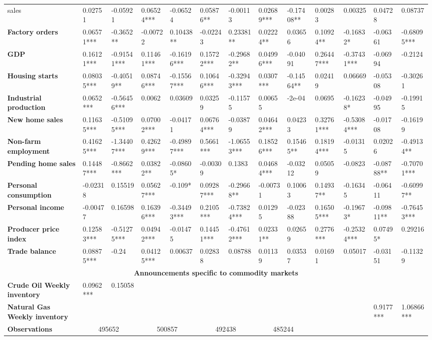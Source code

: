 \begin{sidewaystable}
{\begin{tabular}{@{}lllllllllllll@{}}
sales}& 0.02751 & -0.05921 & 0.06524*** & -0.06524 & 0.05876** & -0.00113 & 0.02689*** & -0.17408** & 0.00283 & 0.00325 & 0.04728 & 0.08737 \\ \textbf{Factory orders}& 0.06571*** & -0.3652** & -0.00722 & 0.10438** & -0.02243 & 0.23381** & 0.02224** & 0.03656 & 0.10924** & -0.16832* & -0.06361 & -0.68095*** \\ \textbf{GDP}& 0.16121*** & -0.91541*** & 0.11461*** & -0.16196*** & 0.15722*** & -0.29682** & 0.04996*** & -0.04091 & 0.26447*** & -0.37431*** & -0.06994 & -0.2124 \\ \textbf{Housing starts}& 0.08035*** & -0.40519** & 0.08746*** & -0.15567*** & 0.10646*** & -0.32943*** & 0.0307*** & -0.14564** & 0.02419 & 0.06669 & -0.05308 & -0.30261 \\ \textbf{Industrial production}& 0.0652*** & -0.56456*** & 0.0062 & 0.03609 & 0.03259 & -0.11575 & 0.00655 & -2e-04 & 0.0695 & -0.16238* & -0.04995 & -0.19915 \\ \textbf{New home sales}& 0.11635*** & -0.51095*** & 0.07002*** & -0.04171 & 0.06764*** & -0.03879 & 0.04642*** & 0.04233 & 0.32761*** & -0.53084*** & -0.01708 & -0.16199 \\ \textbf{Non-farm employment}& 0.41625*** & -1.34407*** & 0.42629*** & -0.49897*** & 0.5661*** & -1.06553*** & 0.18526*** & 0.15465** & 0.18194*** & -0.01315 & 0.02026 & -0.49134** \\ \textbf{Pending home sales}& 0.14487*** & -0.8662*** & 0.03822** & -0.08605* & -0.00309 & 0.1383 & 0.04684*** & -0.03212 & 0.05059 & -0.0823 & -0.08788** & -0.70701*** \\ \textbf{Personal consumption}& -0.02318 & 0.15519 & 0.05627*** & -0.109* & 0.09287*** & -0.29668** & -0.00731 & 0.10063 & 0.14937** & -0.16345 & -0.06411 & -0.60997** \\ \textbf{Personal income}& -0.00477 & 0.16598 & 0.16396*** & -0.34493*** & 0.2105*** & -0.73824*** & 0.01295 & -0.02388 & 0.16505*** & -0.19673* & -0.09811** & -0.76453*** \\ \textbf{Producer price index}& 0.12583*** & -0.51275*** & 0.04942*** & -0.01475 & 0.14451*** & -0.47612*** & 0.02331** & 0.02659 & 0.2776*** & -0.25324*** & 0.07495* & 0.29216 \\ \textbf{Trade balance}& 0.08875*** & -0.24 & 0.04125*** & 0.00637 & 0.02838 & 0.08788 & 0.01139 & 0.03537 & 0.01691 & 0.05017 & -0.03151 & -0.11329 \\  \midrule \multicolumn{13}{c}{\textbf{Announcements specific to commodity markets}} \\ \midrule \textbf{Crude Oil Weekly inventory}& 0.0962*** & 0.15058 &  &  &  &  &  &  &  &  &  &  \\ \textbf{Natural Gas Weekly inventory}&  &  &  &  &  &  &  &  &  &  & 0.9177*** & 1.06866*** \\  \midrule \textbf{Observations}             &\multicolumn{2}{c}{ 495652 }                                                 & \multicolumn{2}{c}{ 500857 }                                                 & \multicolumn{2}{c}{ 492438 }                                                 & \multicolumn{2}{c}{ 485244 }                                                 & 
\end{tabular}}
\end{sidewaystable}
